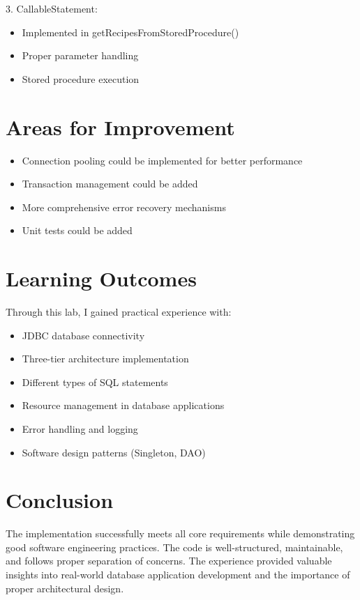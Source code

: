 \documentclass[12pt]{article}
\begin{document}
3. CallableStatement:
\begin{itemize}
    \item Implemented in getRecipesFromStoredProcedure()
    \item Proper parameter handling
    \item Stored procedure execution
\end{itemize}

\section{Areas for Improvement}
\begin{itemize}
    \item Connection pooling could be implemented for better performance
    \item Transaction management could be added
    \item More comprehensive error recovery mechanisms
    \item Unit tests could be added
\end{itemize}

\section{Learning Outcomes}
Through this lab, I gained practical experience with:
\begin{itemize}
    \item JDBC database connectivity
    \item Three-tier architecture implementation
    \item Different types of SQL statements
    \item Resource management in database applications
    \item Error handling and logging
    \item Software design patterns (Singleton, DAO)
\end{itemize}

\section{Conclusion}
The implementation successfully meets all core requirements while demonstrating
good software engineering practices. The code is well-structured, maintainable,
and follows proper separation of concerns. The experience provided valuable
insights into real-world database application development and the importance of
proper architectural design.
\end{document}
